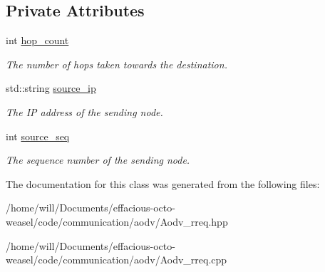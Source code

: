 \subsection*{Private Attributes}
\begin{DoxyCompactItemize}
\item 
int \hyperlink{class_aodv__rreq_af28bf51b5018f33b1b8b421547c95888}{hop\+\_\+count}\hypertarget{class_aodv__rreq_af28bf51b5018f33b1b8b421547c95888}{}\label{class_aodv__rreq_af28bf51b5018f33b1b8b421547c95888}

\begin{DoxyCompactList}\small\item\em The number of hops taken towards the destination. \end{DoxyCompactList}\item 
std\+::string \hyperlink{class_aodv__rreq_ab0b8343c439224569fc90a41f214a9d1}{source\+\_\+ip}\hypertarget{class_aodv__rreq_ab0b8343c439224569fc90a41f214a9d1}{}\label{class_aodv__rreq_ab0b8343c439224569fc90a41f214a9d1}

\begin{DoxyCompactList}\small\item\em The IP address of the sending node. \end{DoxyCompactList}\item 
int \hyperlink{class_aodv__rreq_aea83a870e2c223b5d0a0eb29bf5f6011}{source\+\_\+seq}\hypertarget{class_aodv__rreq_aea83a870e2c223b5d0a0eb29bf5f6011}{}\label{class_aodv__rreq_aea83a870e2c223b5d0a0eb29bf5f6011}

\begin{DoxyCompactList}\small\item\em The sequence number of the sending node. \end{DoxyCompactList}\end{DoxyCompactItemize}


The documentation for this class was generated from the following files\+:\begin{DoxyCompactItemize}
\item 
/home/will/\+Documents/effacious-\/octo-\/weasel/code/communication/aodv/Aodv\+\_\+rreq.\+hpp\item 
/home/will/\+Documents/effacious-\/octo-\/weasel/code/communication/aodv/Aodv\+\_\+rreq.\+cpp\end{DoxyCompactItemize}
